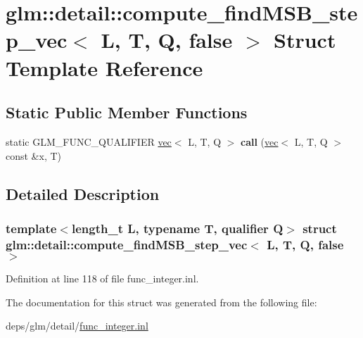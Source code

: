 \hypertarget{structglm_1_1detail_1_1compute__findMSB__step__vec_3_01L_00_01T_00_01Q_00_01false_01_4}{}\section{glm\+:\+:detail\+:\+:compute\+\_\+find\+M\+S\+B\+\_\+step\+\_\+vec$<$ L, T, Q, false $>$ Struct Template Reference}
\label{structglm_1_1detail_1_1compute__findMSB__step__vec_3_01L_00_01T_00_01Q_00_01false_01_4}
\subsection*{Static Public Member Functions}
\begin{DoxyCompactItemize}
\item 
\mbox{\label{structglm_1_1detail_1_1compute__findMSB__step__vec_3_01L_00_01T_00_01Q_00_01false_01_4_acbe28b61cee8601996d2ddaca2b9efd3}} 
static G\+L\+M\+\_\+\+F\+U\+N\+C\+\_\+\+Q\+U\+A\+L\+I\+F\+I\+ER \hyperlink{structglm_1_1vec}{vec}$<$ L, T, Q $>$ {\bfseries call} (\hyperlink{structglm_1_1vec}{vec}$<$ L, T, Q $>$ const \&x, T)
\end{DoxyCompactItemize}


\subsection{Detailed Description}
\subsubsection*{template$<$length\+\_\+t L, typename T, qualifier Q$>$\newline
struct glm\+::detail\+::compute\+\_\+find\+M\+S\+B\+\_\+step\+\_\+vec$<$ L, T, Q, false $>$}



Definition at line 118 of file func\+\_\+integer.\+inl.



The documentation for this struct was generated from the following file\+:\begin{DoxyCompactItemize}
\item 
deps/glm/detail/\hyperlink{func__integer_8inl}{func\+\_\+integer.\+inl}\end{DoxyCompactItemize}
